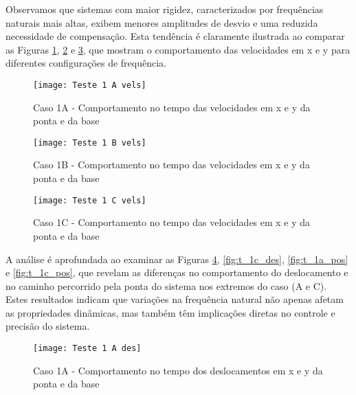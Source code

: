 Observamos que sistemas com maior rigidez, caracterizados por frequências naturais mais altas, exibem menores amplitudes de desvio e uma reduzida necessidade de compensação. Esta tendência é claramente ilustrada ao comparar as Figuras \ref{fig:t_1a_vels}, \ref{fig:t_1b_vels} e \ref{fig:t_1c_vels}, que mostram o comportamento das velocidades em x e y para diferentes configurações de frequência.

\begin{figure}[H]
    \begin{center}
    \caption{Caso 1A - Comportamento no tempo das velocidades em x e y da ponta e da base}
    \texttt{[image: Teste 1 A vels]}
    \label{fig:t_1a_vels}
    \end{center}
\end{figure}

\begin{figure}[H]
    \begin{center}
    \caption{Caso 1B - Comportamento no tempo das velocidades em x e y da ponta e da base}
    \texttt{[image: Teste 1 B vels]}
    \label{fig:t_1b_vels}
    \end{center}
\end{figure}

\begin{figure}[H]
    \begin{center}
    \caption{Caso 1C - Comportamento no tempo das velocidades em x e y da ponta e da base}
    \texttt{[image: Teste 1 C vels]}
    \label{fig:t_1c_vels}
    \end{center}
\end{figure}

A análise é aprofundada ao examinar as Figuras \ref{fig:t_1a_des}, \ref{fig:t_1c_des}, \ref{fig:t_1a_pos} e \ref{fig:t_1c_pos}, que revelam as diferenças no comportamento do deslocamento e no caminho percorrido pela ponta do sistema nos extremos do caso (A e C). Estes resultados indicam que variações na frequência natural não apenas afetam as propriedades dinâmicas, mas também têm implicações diretas no controle e precisão do sistema.

\begin{figure}[H]
    \begin{center}
    \caption{Caso 1A - Comportamento no tempo dos deslocamentos em x e y da ponta e da base}
    \texttt{[image: Teste 1 A des]}
    \label{fig:t_1a_des}
    \end{center}
\end{figure}

